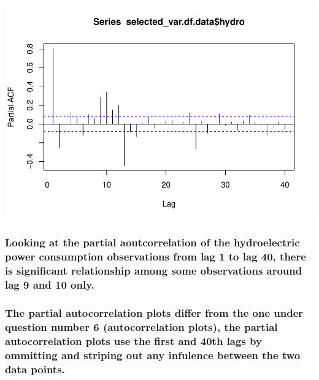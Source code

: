 \documentclass[
]{article}
\begin{document}
\includegraphics{YaredAsfaw_TSA_A02_Sp22_files/figure-latex/unnamed-chunk-23-1.pdf}

\hypertarget{looking-at-the-partial-aoutcorrelation-of-the-hydroelectric-power-consumption-observations-from-lag-1-to-lag-40-there-is-significant-relationship-among-some-observations-around-lag-9-and-10-only.}{%
\subsubsection{Looking at the partial aoutcorrelation of the
hydroelectric power consumption observations from lag 1 to lag 40, there
is significant relationship among some observations around lag 9 and 10
only.}\label{looking-at-the-partial-aoutcorrelation-of-the-hydroelectric-power-consumption-observations-from-lag-1-to-lag-40-there-is-significant-relationship-among-some-observations-around-lag-9-and-10-only.}}

\hypertarget{the-partial-autocorrelation-plots-differ-from-the-one-under-question-number-6-autocorrelation-plots-the-partial-autocorrelation-plots-use-the-first-and-40th-lags-by-ommitting-and-striping-out-any-infulence-between-the-two-data-points.}{%
\subsubsection{The partial autocorrelation plots differ from the one
under question number 6 (autocorrelation plots), the partial
autocorrelation plots use the first and 40th lags by ommitting and
striping out any infulence between the two data
points.}\label{the-partial-autocorrelation-plots-differ-from-the-one-under-question-number-6-autocorrelation-plots-the-partial-autocorrelation-plots-use-the-first-and-40th-lags-by-ommitting-and-striping-out-any-infulence-between-the-two-data-points.}}
\end{document}
